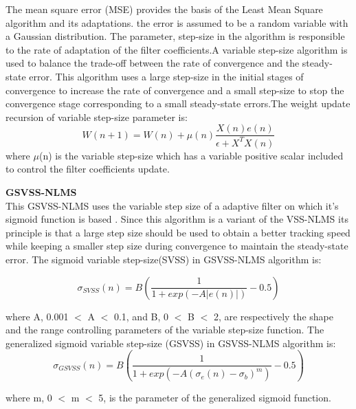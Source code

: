 \documentclass[10pt,twocolumn]{witseiepaper}
\begin{document}
The mean square error (MSE) provides the basis of the Least Mean Square algorithm and its adaptations. the error is assumed to be a random variable with a Gaussian distribution. The parameter, step-size in the algorithm is responsible to the rate of adaptation of the filter
coefficients.A variable step-size algorithm is used to balance the trade-off
between the rate of convergence and the steady-state error. This algorithm uses a large step-size in the initial stages of convergence to increase the rate of convergence and a small step-size to stop the convergence stage corresponding to a small steady-state errors.The weight update recursion of variable step-size parameter is:
\begin{equation}\label{my_first_eqn}
W(n+1)=W(n)+\mu(n) \frac{X(n)e(n)}{\epsilon+X^TX(n)}
\end{equation}
where $\mu$(n) is the variable step-size which has a variable positive
scalar included to control the filter coefficients update\cite{echo}.


\textbf{GSVSS-NLMS} \hfill\\
This GSVSS-NLMS uses the variable step size of a adaptive filter on which it's sigmoid function is based . Since this algorithm is a variant of the VSS-NLMS its principle is that a large step size  should be used to obtain a better tracking speed while keeping a smaller step size during convergence to maintain the steady-state error.
The sigmoid variable step-size(SVSS) in GSVSS-NLMS algorithm is:

\begin{equation}\label{my_first_eqn}
\sigma_{SVSS}(n)=B(\frac{1}{1+exp(-A|e(n)|)}-0.5)
\end{equation}

where A, 0.001 $<$ A $<$ 0.1, and B, 0 $<$ B $<$ 2, are respectively the
shape and the range controlling parameters of the variable step-size
function.
The generalized sigmoid variable step-size (GSVSS) in GSVSS-NLMS algorithm
is:
\begin{equation}\label{my_first_eqn}
\sigma_{GSVSS}(n)=B(\frac{1}{1+exp(-A(\sigma_e(n)-\sigma_b)^m)}-0.5)
\end{equation}

where m, 0 $<$ m $<$ 5, is the parameter of the generalized sigmoid function.
\end{document}
